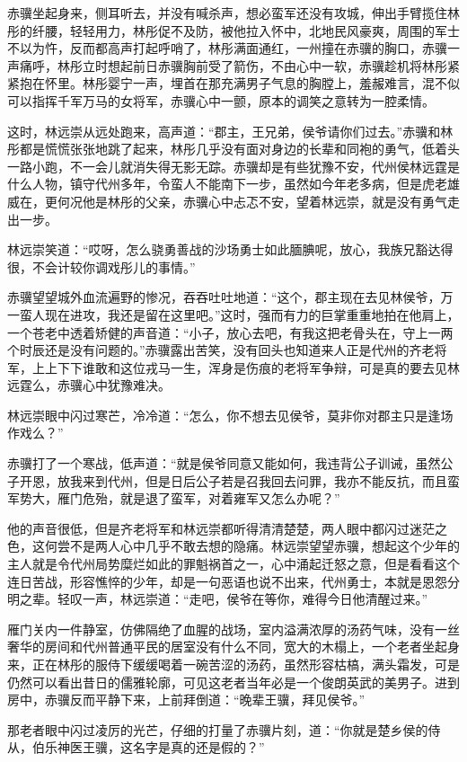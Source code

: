 赤骥坐起身来，侧耳听去，并没有喊杀声，想必蛮军还没有攻城，伸出手臂揽住林彤的纤腰，轻轻用力，林彤促不及防，被他拉入怀中，北地民风豪爽，周围的军士不以为忤，反而都高声打起呼哨了，林彤满面通红，一州撞在赤骥的胸口，赤骥一声痛呼，林彤立时想起前日赤骥胸前受了箭伤，不由心中一软，赤骥趁机将林彤紧紧抱在怀里。林彤婴宁一声，埋首在那充满男子气息的胸膛上，羞赧难言，混不似可以指挥千军万马的女将军，赤骥心中一颤，原本的调笑之意转为一腔柔情。

这时，林远崇从远处跑来，高声道：“郡主，王兄弟，侯爷请你们过去。”赤骥和林彤都是慌慌张张地跳了起来，林彤几乎没有面对身边的长辈和同袍的勇气，低着头一路小跑，不一会儿就消失得无影无踪。赤骥却是有些犹豫不安，代州侯林远霆是什么人物，镇守代州多年，令蛮人不能南下一步，虽然如今年老多病，但是虎老雄威在，更何况他是林彤的父亲，赤骥心中忐忑不安，望着林远崇，就是没有勇气走出一步。

林远崇笑道：“哎呀，怎么骁勇善战的沙场勇士如此腼腆呢，放心，我族兄豁达得很，不会计较你调戏彤儿的事情。”

赤骥望望城外血流遍野的惨况，吞吞吐吐地道：“这个，郡主现在去见林侯爷，万一蛮人现在进攻，我还是留在这里吧。”这时，强而有力的巨掌重重地拍在他肩上，一个苍老中透着矫健的声音道：“小子，放心去吧，有我这把老骨头在，守上一两个时辰还是没有问题的。”赤骥露出苦笑，没有回头也知道来人正是代州的齐老将军，上上下下谁敢和这位戎马一生，浑身是伤痕的老将军争辩，可是真的要去见林远霆么，赤骥心中犹豫难决。

林远崇眼中闪过寒芒，冷冷道：“怎么，你不想去见侯爷，莫非你对郡主只是逢场作戏么？”

赤骥打了一个寒战，低声道：“就是侯爷同意又能如何，我违背公子训诫，虽然公子开恩，放我来到代州，但是日后公子若是召我回去问罪，我亦不能反抗，而且蛮军势大，雁门危殆，就是退了蛮军，对着雍军又怎么办呢？”

他的声音很低，但是齐老将军和林远崇都听得清清楚楚，两人眼中都闪过迷茫之色，这何尝不是两人心中几乎不敢去想的隐痛。林远崇望望赤骥，想起这个少年的主人就是令代州局势糜烂如此的罪魁祸首之一，心中涌起迁怒之意，但是看看这个连日苦战，形容憔悴的少年，却是一句恶语也说不出来，代州勇士，本就是恩怨分明之辈。轻叹一声，林远崇道：“走吧，侯爷在等你，难得今日他清醒过来。”

雁门关内一件静室，仿佛隔绝了血腥的战场，室内溢满浓厚的汤药气味，没有一丝奢华的房间和代州普通平民的居室没有什么不同，宽大的木榻上，一个老者坐起身来，正在林彤的服侍下缓缓喝着一碗苦涩的汤药，虽然形容枯槁，满头霜发，可是仍然可以看出昔日的儒雅轮廓，可见这老者当年必是一个俊朗英武的美男子。进到房中，赤骥反而平静下来，上前拜倒道：“晚辈王骥，拜见侯爷。”

那老者眼中闪过凌厉的光芒，仔细的打量了赤骥片刻，道：“你就是楚乡侯的侍从，伯乐神医王骥，这名字是真的还是假的？”

